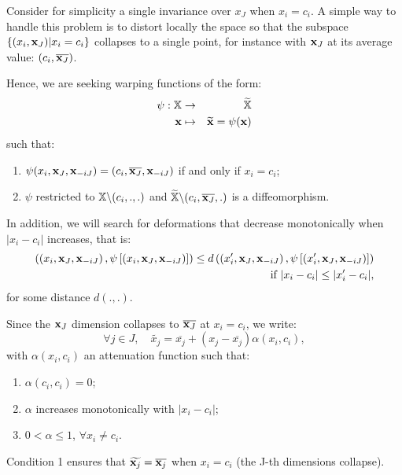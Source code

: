 Consider for simplicity a single invariance over $x_J$ when $x_i = c_i$. 
A simple way to handle this problem is to distort locally the space so that the subspace $\{(x_i, \mathbf{x}_J) | x_i = c_i\}$ collapses to a single point,
for instance with $\mathbf{x}_J$ at its average value: $(c_i, \overline{\mathbf{x}_J})$.

Hence, we are seeking warping functions of the form: 
\begin{eqnarray*}
 \psi: \mathbb{X} &\rightarrow& \widetilde{\mathbb{X}} \\
 \mathbf{x} & \mapsto &  \widetilde{\mathbf{x}} = \psi(\mathbf{x})
\end{eqnarray*}
such that:
\begin{enumerate}
 \item $\psi(x_i, \mathbf{x}_J, \mathbf{x}_{-iJ}) = (c_i, \overline{\mathbf{x}_J}, \mathbf{x}_{-iJ})$ if and only if $x_i=c_i$;%
 \item $\psi$ restricted to $\mathbb{X} \backslash (c_i,.,.)$ and $\widetilde{\mathbb{X}} \backslash (c_i,\overline{\mathbf{x}_J},.)$ is a diffeomorphism.
\end{enumerate}

In addition, we will search for deformations that decrease monotonically when $\lvert x_i - c_i\rvert$ increases, that is: 
 \begin{eqnarray*}
  \left( \left(x_i, \mathbf{x}_J, \mathbf{x}_{-iJ} \right), \psi\left[\left(x_i, \mathbf{x}_J, \mathbf{x}_{-iJ}\right)\right] \right)\leq d \left( \left(x_i', \mathbf{x}_J, \mathbf{x}_{-iJ} \right), 
 \psi\left[\left(x_i', \mathbf{x}_J, \mathbf{x}_{-iJ}\right)\right]\right)  \\ \text{ if }\lvert x_i- c_i\rvert \leq \lvert x_i'- c_i\rvert, 
 \end{eqnarray*}
for some distance $d(.,.)$.
  
Since the $\mathbf{x}_J$ dimension collapses to $\overline{\mathbf{x}_J}$ at $x_i=c_i$, we write:
\begin{equation}
 \forall j \in J, \quad \widetilde{x_j} = \overline{x_j} + \left( x_j - \overline{x_j}\right)\alpha(x_i, c_i),
\end{equation}
with $\alpha(x_i, c_i)$ an attenuation function such that:
\begin{enumerate}
 \item $\alpha(c_i, c_i) = 0$;
 \item $\alpha$ increases monotonically with $\lvert x_i - c_i\rvert$;
 \item $0 < \alpha \leq 1$, $\forall x_i \neq c_i$.
\end{enumerate}
Condition 1 ensures that $\widetilde{\mathbf{x}_j} = \overline{\mathbf{x}_j}$ when $x_i=c_i$ (the J-th dimensions  collapse).


